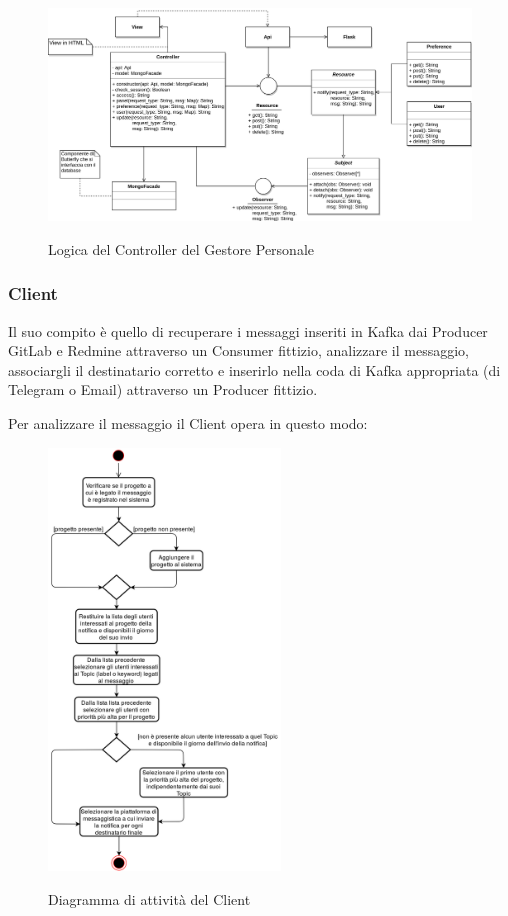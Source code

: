     \begin{figure}[H]
        \centering
        \includegraphics[width=\textwidth]{img/GP-View.png}\\
        \caption{Logica del Controller del Gestore Personale}
        \label{fig:GP-View}
    \end{figure}



\subsubsection{Client}
Il suo compito è quello di recuperare i messaggi inseriti in Kafka dai Producer GitLab e Redmine attraverso un Consumer fittizio, analizzare il messaggio, associargli il destinatario corretto e inserirlo nella coda di Kafka appropriata (di Telegram o Email) attraverso un Producer fittizio.

Per analizzare il messaggio il Client opera in questo modo:

\begin{figure}[H]
    \centering
    \includegraphics[width=0.55\textwidth]{img/Client_attivita.png}\\
    \caption{Diagramma di attività del Client}
\end{figure}


